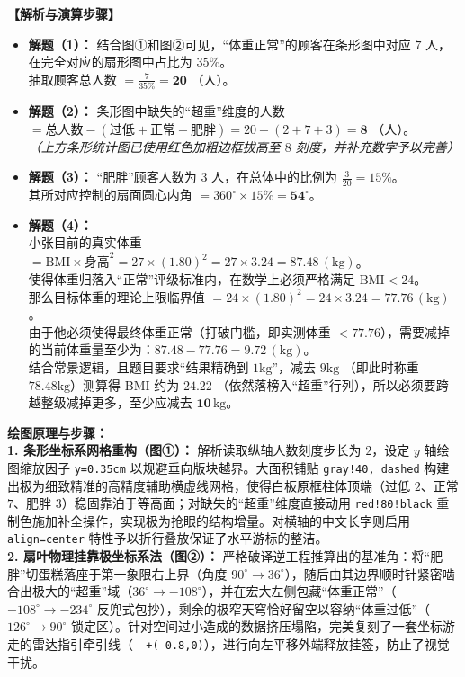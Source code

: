 \documentclass[12pt, a4paper]{ctexrep}
\begin{document}
\vspace{0.4cm}
\textbf{【解析与演算步骤】}
\begin{itemize}
    \item \textbf{解题（1）：} 结合图①和图②可见，“体重正常”的顾客在条形图中对应 $7$ 人，在完全对应的扇形图中占比为 $35\%$。\\
    抽取顾客总人数 $= \frac{7}{35\%} = \mathbf{20}$ （人）。
    \item \textbf{解题（2）：} 条形图中缺失的“超重”维度的人数 $= \text{总人数} - (\text{过低} + \text{正常} + \text{肥胖}) = 20 - (2 + 7 + 3) = \mathbf{8}$ （人）。\\
    \textit{（上方条形统计图已使用红色加粗边框拔高至 $8$ 刻度，并补充数字予以完善）}
    \item \textbf{解题（3）：} “肥胖”顾客人数为 $3$ 人，在总体中的比例为 $\frac{3}{20} = 15\%$。\\
    其所对应控制的扇面圆心内角 $= 360^\circ \times 15\% = \mathbf{54^\circ}$。
    \item \textbf{解题（4）：} \\
    小张目前的真实体重 $= \text{BMI} \times \text{身高}^2 = 27 \times (1.80)^2 = 27 \times 3.24 = 87.48 \, (\mathrm{kg})$。\\
    使得体重归落入“正常”评级标准内，在数学上必须严格满足 $\text{BMI} < 24$。\\
    那么目标体重的理论上限临界值 $= 24 \times (1.80)^2 = 24 \times 3.24 = 77.76 \, (\mathrm{kg})$。\\
    由于他必须使得最终体重正常（打破门槛，即实测体重 $< 77.76$），需要减掉的当前体重量至少为：$87.48 - 77.76 = 9.72 \, (\mathrm{kg})$。\\
    结合常景逻辑，且题目要求“结果精确到 $1\mathrm{kg}$”，减去 $9\mathrm{kg}$ （即此时称重 $78.48\mathrm{kg}$）测算得 BMI 约为 $24.22$ （依然落榜入“超重”行列），所以必须要跨越整级减掉更多，至少应减去 $\mathbf{10 \, \mathrm{kg}}$。
\end{itemize}

\vspace{0.4cm}
{\small\color{blue!70!black}
\textbf{绘图原理与步骤：}\\
\textbf{1. 条形坐标系网格重构（图①）：} 解析读取纵轴人数刻度步长为 $2$，设定 $y$ 轴绘图缩放因子 \texttt{y=0.35cm} 以规避垂向版块越界。大面积铺贴 \texttt{gray!40, dashed} 构建出极为细致精准的高精度辅助横虚线网格，使得白板原框柱体顶端（过低 $2$、正常 $7$、肥胖 $3$）稳固靠泊于等高面；对缺失的“超重”维度直接动用 \texttt{red!80!black} 重制色施加补全操作，实现极为抢眼的结构增量。对横轴的中文长字则启用 \texttt{align=center} 特性予以折行叠放保证了水平游标的整洁。\\
\textbf{2. 扇叶物理挂靠极坐标系法（图②）：} 严格破译逆工程推算出的基准角：将“肥胖”切蛋糕落座于第一象限右上界（角度 $90^\circ \to 36^\circ$），随后由其边界顺时针紧密啮合出极大的“超重”域（$36^\circ \to -108^\circ$），并在宏大左侧包藏“体重正常”（$-108^\circ \to -234^\circ$ 反兜式包抄），剩余的极窄天穹恰好留空以容纳“体重过低”（$126^\circ \to 90^\circ$ 锁定区）。针对空间过小造成的数据挤压塌陷，完美复刻了一套坐标游走的雷达指引牵引线（\texttt{-- +(-0.8,0)}），进行向左平移外端释放挂签，防止了视觉干扰。
}
\end{document}
